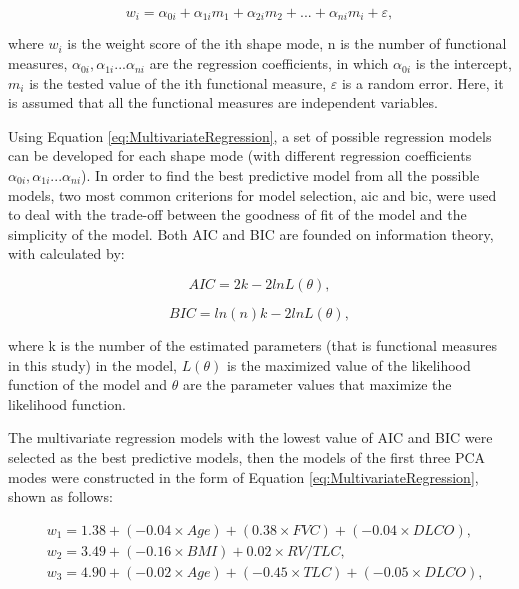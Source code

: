 \begin{equation}
 \label{eq:MultivariateRegression}
 w_i = \alpha_{0i} + \alpha_{1i}m_1 + \alpha_{2i}m_2 + ... + \alpha_{ni}m_i + \varepsilon,
\end{equation}

\noindent where $w_i$ is the weight score of the ith shape mode, n is the number of functional measures, $\alpha_{0i}, \alpha_{1i} ... \alpha_{ni}$ are the regression coefficients, in which $\alpha_{0i}$ is the intercept, $m_i$ is the tested value of the ith functional measure, $\varepsilon$ is a random error. Here, it is assumed that all the functional measures are independent variables.

Using Equation \ref{eq:MultivariateRegression}, a set of possible regression models can be developed for each shape mode (with different regression coefficients $\alpha_{0i}, \alpha_{1i} ... \alpha_{ni}$). In order to find the best predictive model from all the possible models, two most common criterions for model selection, \gls{aic} and \gls{bic}, were used to deal with the trade-off between the goodness of fit of the model and the simplicity of the model. Both AIC and BIC are founded on information theory, with calculated by:

\begin{equation}
 \label{eq:AIC}
 AIC = 2k - 2lnL(\theta),
\end{equation}

\begin{equation}
 \label{eq:BIC}
 BIC = ln(n)k - 2lnL(\theta),
\end{equation}

\noindent where k is the number of the estimated parameters (that is functional measures in this study) in the model, $L(\theta)$ is the maximized value of the likelihood function of the model and $\theta$ are the parameter values that maximize the likelihood function.

The multivariate regression models with the lowest value of AIC and BIC were selected as the best predictive models, then the models of the first three PCA modes were constructed in the form of Equation \ref{eq:MultivariateRegression}, shown as follows:

\begin{equation} 
 \label{eq:TerminalBoundaryCondition}
 \begin{split}
 & w_1 = 1.38 + (-0.04 \times Age) + (0.38 \times FVC) + (-0.04 \times DLCO), \\
 & w_2 = 3.49 + (-0.16 \times BMI) + 0.02 \times RV/TLC, \\
 & w_3 = 4.90 + (-0.02 \times Age) + (-0.45 \times TLC) + (-0.05 \times DLCO), \\
 \end{split}
\end{equation}
 
